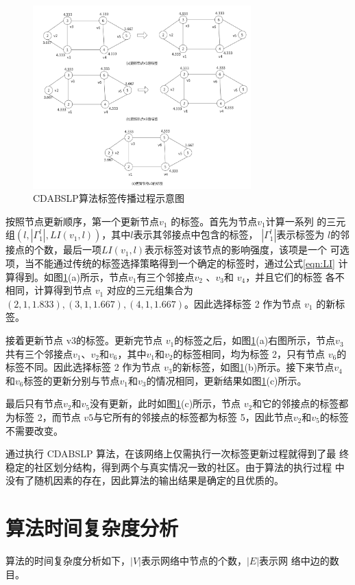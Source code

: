 \begin{figure}
  \centering
  \includegraphics[width=0.75\textwidth]{figures/fig3-4}
  \caption{CDABSLP算法标签传播过程示意图}\label{fig:fig3-4}
 \end{figure}

 按照节点更新顺序，第一个更新节点$v_1$
的标签。首先为节点$v_1$计算一系列
的三元组$(l,|\Gamma _1^l|,LI(v_1,l))$，其中$ l $表示其邻接点中包含的标签，
$|\Gamma _1^l|$表示标签为
$l $的邻接点的个数，最后一项$LI(v_1,l)$表示标签对该节点的影响强度，该项是一个
可选项，当不能通过传统的标签选择策略得到一个确定的标签时，通过公式\ref{eqn:LI}
计算得到。如图\ref{fig:fig3-4}(a)所示，节点$ v_1
$有三个邻接点$ v_2$
、$v_3$和 $v_4$，并且它们的标签
各不相同，计算得到节点 $v_1$
对应的三元组集合为${(2, 1, 1.833), (3, 1, 1.667), (4, 1, 
1.667)}$。因此选择标签 2 作为节点 $v_1$
的新标签。 

接着更新节点 v3的标签。更新完节点 $v_1$的标签之后，如图\ref{fig:fig3-4}(a)右图所示，节点$ v_3$共有三个邻接点$ v_1$、$v_2$和$ v_6$，其中$ v_1$和$ v_2$的标签相同，均为标签 2，只有节点 $v_6$的标签不同。因此选择标签 2 作为节点 $v_3$的新标签，如图\ref{fig:fig3-4}(b)所示。接下来节点$ v_4$和$ v_6$标签的更新分别与节点$ v_1$和$ v_3$的情况相同，更新结果如图\ref{fig:fig3-4}(c)所示。

最后只有节点$ v_2$和$ v_5$没有更新，此时如图\ref{fig:fig3-4}(c)所示，节点 $v_2$和它的邻接点的标签都为标签 2，而节点 $v5$与它所有的邻接点的标签都为标签 5，因此节点$v_2$和$ v_5$的标签不需要改变。

通过执行 CDABSLP 算法，在该网络上仅需执行一次标签更新过程就得到了最
终稳定的社区划分结构，得到两个与真实情况一致的社区。由于算法的执行过程
中没有了随机因素的存在，因此算法的输出结果是确定的且优质的。 

\section{算法时间复杂度分析}
算法的时间复杂度分析如下，$|V|$表示网络中节点的个数，$|E|$表示网
络中边的数目。 

